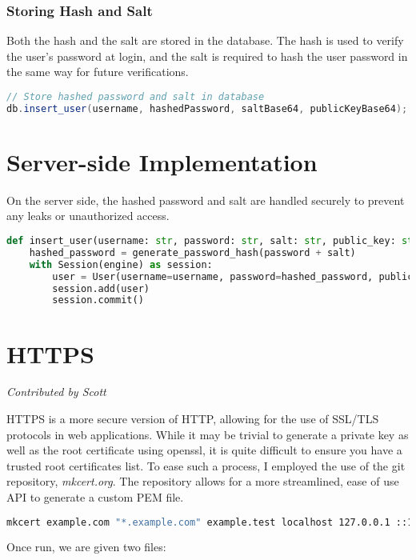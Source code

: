 \documentclass{article}
\begin{document}
\subsubsection*{Storing Hash and Salt}
Both the hash and the salt are stored in the database. The hash is used to verify the user's password at login, and the salt is required to hash the user password in the same way for future verifications.

\begin{lstlisting}[language=Java]
// Store hashed password and salt in database
db.insert_user(username, hashedPassword, saltBase64, publicKeyBase64);
\end{lstlisting}

\section*{Server-side Implementation}
On the server side, the hashed password and salt are handled securely to prevent any leaks or unauthorized access.

\begin{lstlisting}[language=Python]
def insert_user(username: str, password: str, salt: str, public_key: str):
    hashed_password = generate_password_hash(password + salt)
    with Session(engine) as session:
        user = User(username=username, password=hashed_password, public_key=public_key)
        session.add(user)
        session.commit()
\end{lstlisting}

\section{HTTPS}
\textit{Contributed by Scott}

HTTPS is a more secure version of HTTP, allowing for the use of SSL/TLS protocols in web applications. While it may be trivial to generate a private key as well as the root certificate using openssl, it is quite difficult to ensure you have a trusted root certificates list. To ease such a process, I employed the use of the git repository, \textit{mkcert.org}. The repository allows for a more streamlined, ease of use API to generate a custom PEM file. 

\begin{lstlisting}[language=bash]
mkcert example.com "*.example.com" example.test localhost 127.0.0.1 ::1
\end{lstlisting}

Once run, we are given two files:
\end{document}
